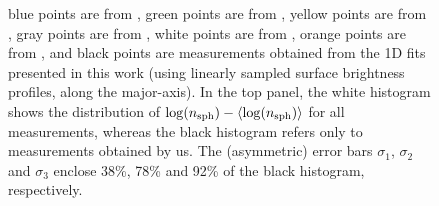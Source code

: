 \documentclass[preprint2]{emulateapj}
\begin{document}
\begin{figure}
\begin{center}
{blue points are from \cite{laurikainen2010}, green points are from \cite{sani2011}, 
yellow points are from \cite{vika2012}, gray points are from \cite{beifiori2012},
white points are from \cite{rusli2013}, orange points are from \cite{lasker2014data},
and black points are measurements obtained from the 1D fits presented in this work 
(using linearly sampled surface brightness profiles, along the major-axis).
In the top panel, the white histogram shows the distribution of $\log(n_{\rm sph}) - \langle \log(n_{\rm sph}) \rangle$ 
for all measurements, 
whereas the black histogram refers only to measurements obtained by us.
The (asymmetric) error bars $\sigma_1$, $\sigma_2$ and $\sigma_3$ enclose 38\%, 78\% and 92\% 
of the black histogram, respectively.}
\label{fig:compn}
\end{center}
\end{figure}
\end{document}
